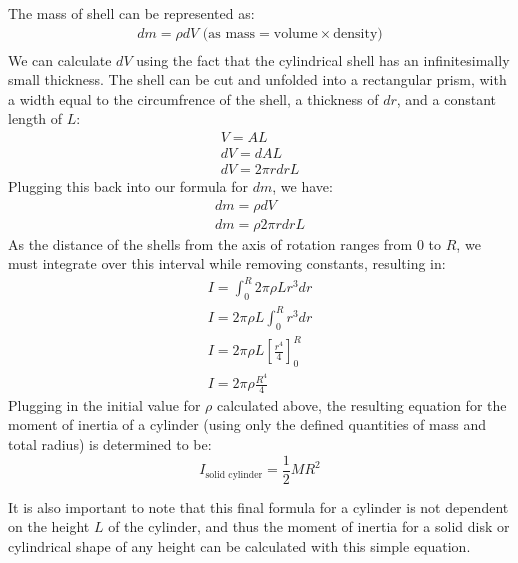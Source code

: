 The mass of shell can be represented as:
\begin{gather*}
dm = \rho dV \text{ (as mass} = \text{volume} \times \text{density)} \\
\end{gather*}
We can calculate $dV$ using the fact that the cylindrical shell has an infinitesimally small thickness. The shell can be cut and unfolded into a rectangular prism, with a width equal to the circumfrence of the shell, a thickness of $dr$, and a constant length of $L$:
\begin{gather*}
V = AL \\
dV = dAL \\
dV = 2\pi r dr L
\end{gather*}
Plugging this back into our formula for $dm$, we have:
\begin{gather*}
dm = \rho dV \\
dm = \rho 2\pi r dr L
\end{gather*}
As the distance of the shells from the axis of rotation ranges from $0$ to $R$, we must integrate over this interval while removing constants, resulting in:
\begin{gather*}
I = \int_0^R 2\pi\rho L r^3dr \\
I = 2\pi\rho L\int_0^R r^3dr \\
I = 2\pi\rho L\left[\frac{r^4}{4}\right]_0^R \\
I = 2\pi\rho\frac{R^4}{4}
\end{gather*}
Plugging in the initial value for $\rho$ calculated above, the resulting equation for the moment of inertia of a cylinder (using only the defined quantities of mass and total radius) is determined to be:
\begin{equation}
I_{\text{solid cylinder}} = \frac{1}{2}MR^2
\label{eq:final_moment_solid_cylinder}
\end{equation}

It is also important to note that this final formula for a cylinder is not dependent on the height $L$ of the cylinder, and thus the moment of inertia for a solid disk or cylindrical shape of any height can be calculated with this simple equation.